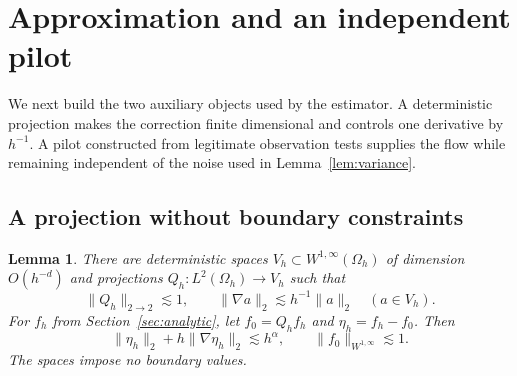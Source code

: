 \documentclass[11pt]{article}
\newtheorem{lemma}[theorem]{Lemma}
\theoremstyle{remark}
\newcommand{\norm}[1]{\lVert #1\rVert}
\begin{document}
\section{Approximation and an independent pilot}\label{sec:construction}
We next build the two auxiliary objects used by the estimator. A deterministic projection makes the correction finite dimensional and controls one derivative by $h^{-1}$. A pilot constructed from legitimate observation tests supplies the flow while remaining independent of the noise used in Lemma~\ref{lem:variance}. 

\subsection{A projection without boundary constraints}
\begin{lemma}\label{lem:projection}  
There are deterministic spaces $V_h\subset W^{1,\infty}(\Omega_h)$ of dimension $O(h^{-d})$ and projections $Q_h:L^2(\Omega_h)\to V_h$ such that
\begin{equation}\label{eq:projectionbounds}
 \norm{Q_h}_{2\to2}\lesssim1,\qquad
 \norm{\nabla a}_2\lesssim h^{-1}\norm a_2\quad(a\in V_h).
\end{equation}
For $f_h$ from Section~\ref{sec:analytic}, let $f_0=Q_hf_h$ and $\eta_h=f_h-f_0$. Then
\begin{equation}\label{eq:approx}
 \norm{\eta_h}_2+h\norm{\nabla\eta_h}_2\lesssim h^\alpha,
 \qquad \norm{f_0}_{W^{1,\infty}}\lesssim1.
\end{equation}
The spaces impose no boundary values.
\end{lemma}
\end{document}
